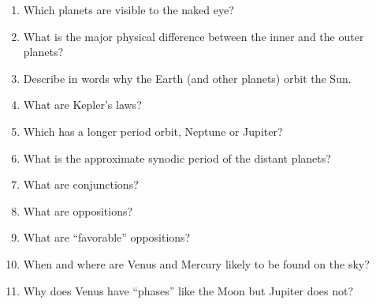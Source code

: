 
\begin{enumerate}
\item Which planets are visible to the naked eye?
\vspace{80pt}
\item What is the major physical difference between the inner and the
  outer planets?
\vspace{80pt}
\item Describe in words why the Earth (and other planets) orbit the
  Sun. 
\vspace{80pt}
\item What are Kepler's laws?
\vspace{120pt}
\item Which has a longer period orbit, Neptune or Jupiter?
\vspace{80pt}
\item What is the approximate synodic period of the distant planets?
\vspace{80pt}
\item What are conjunctions?
\vspace{80pt}
\item What are oppositions?
\vspace{80pt}
\item What are ``favorable'' oppositions?
\vspace{80pt}
\item When and where are Venus and Mercury likely to be found on the
  sky?
\vspace{80pt}
\item Why does Venus have ``phases'' like the Moon but Jupiter does
  not?
\vspace{80pt}
\end{enumerate}
